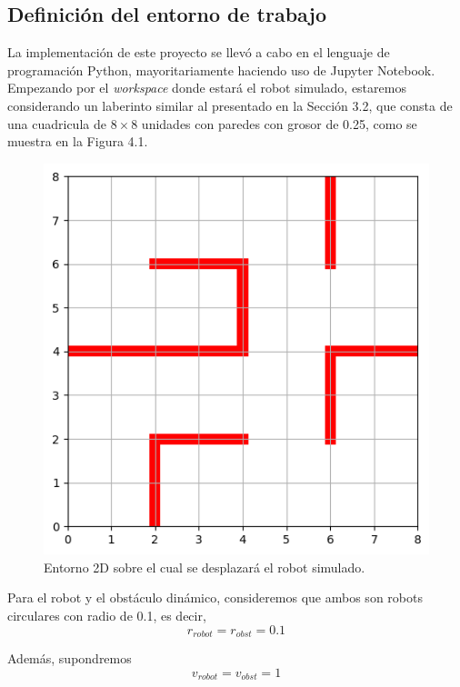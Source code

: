 \documentclass[spanish,mexico]{article}
\numberwithin{equation}{section}
\theoremstyle{definition}
\theoremstyle{remark}
\begin{document}
\subsection{Definición del entorno de trabajo}
La implementación de este proyecto se llevó a cabo en el lenguaje de programación Python, mayoritariamente haciendo uso de Jupyter Notebook. Empezando por el \textit{workspace} donde estará el robot simulado, estaremos considerando un laberinto similar al presentado en la Sección 3.2, que consta de una cuadricula de $8 \times 8$ unidades con paredes con grosor de 0.25, como se muestra en la Figura 4.1.
\begin{figure}[hbtp]
\centering
\includegraphics[scale=0.5]{img/maze.png}
\caption{Entorno 2D sobre el cual se desplazará el robot simulado.}
\end{figure}

Para el robot y el obstáculo dinámico, consideremos que ambos son robots circulares con radio de 0.1, es decir, 
$$r_{robot} = r_{obst} = 0.1$$

Además, supondremos 
$$v_{robot} = v_{obst} = 1$$
\end{document}
